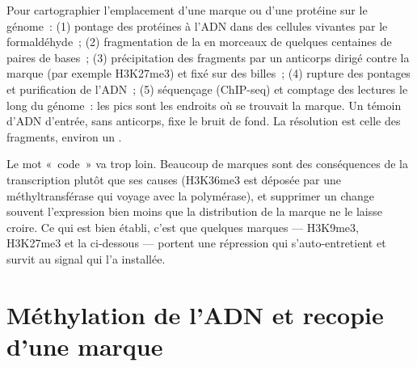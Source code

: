 \begin{method}\label{met:b3:chromatin-epigenetics:chip}
Pour cartographier l'emplacement d'une marque ou d'une protéine sur le
génome~: (1) pontage des protéines à l'ADN dans des cellules vivantes
par le formaldéhyde~; (2) fragmentation de la  en morceaux de
quelques centaines de paires de bases~; (3) précipitation des fragments
par un anticorps dirigé contre la marque (par exemple H3K27me3) et fixé
sur des billes~; (4) rupture des pontages et purification de l'ADN~;
(5) séquençage (ChIP-seq) et comptage des lectures le long du génome~:
les pics sont les endroits où se trouvait la marque. Un témoin d'ADN
d'entrée, sans anticorps, fixe le bruit de fond. La résolution est
celle des fragments, environ un .
\end{method}

\begin{remark}\label{rem:b3:chromatin-epigenetics:code}
Le mot «~code~» va trop loin. Beaucoup de marques sont des conséquences
de la transcription plutôt que ses causes (H3K36me3 est déposée par une
méthyltransférase qui voyage avec la polymérase), et supprimer un
 change souvent l'expression bien moins que la distribution de
la marque ne le laisse croire. Ce qui est bien établi, c'est que
quelques marques --- H3K9me3, H3K27me3 et la 
ci-dessous --- portent une répression qui s'auto-entretient et survit
au signal qui l'a installée.
\end{remark}

\section{Méthylation de l'ADN et recopie d'une marque}

